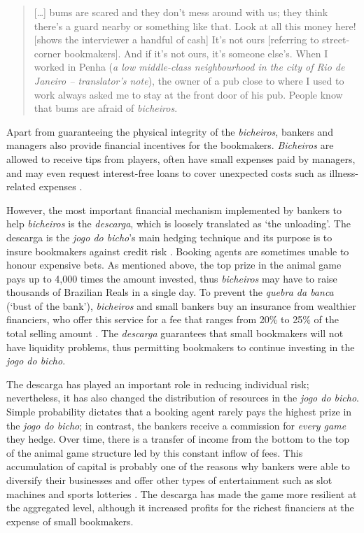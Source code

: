 \begin{quote}
	[\dots] bums are scared and they don't mess around with us; they think there's a guard nearby or something like that. Look at all this money here! [shows the interviewer a handful of cash] It's not ours [referring to street-corner bookmakers]. And if it's not ours, it's someone else's. When I worked in Penha (\emph{a low middle-class neighbourhood in the city of Rio de Janeiro -- translator's note}), the owner of a pub close to where I used to work always asked me to stay at the front door of his pub. People know that bums are afraid of \emph{bicheiros}.
\end{quote}

Apart from guaranteeing the physical integrity of the \emph{bicheiros}, bankers and managers also provide financial incentives for the bookmakers. \emph{Bicheiros} are allowed to receive tips from players, often have small expenses paid by managers, and may even request interest-free loans to cover unexpected costs such as illness-related expenses \citep{labronici2012paratodos}.

However, the most important financial mechanism implemented by bankers to help \emph{bicheiros} is the \emph{descarga}, which is loosely translated as `the unloading'. The descarga is the \emph{jogo do bicho}'s main hedging technique and its purpose is to insure bookmakers against credit risk \citetext{\citealp[59]{labronici2012paratodos}; \citealp[178]{magalhaes2005ganhou}; \citealp[16]{misse2007illegal}; \citealp[75]{soares1993jogo}}. Booking agents are sometimes unable to honour expensive bets. As mentioned above, the top prize in the animal game pays up to 4,000 times the amount invested, thus \emph{bicheiros} may have to raise thousands of Brazilian Reals in a single day. To prevent the \emph{quebra da banca} (`bust of the bank'), \emph{bicheiros} and small bankers buy an insurance from wealthier financiers, who offer this service for a fee that ranges from 20\% to 25\% of the total selling amount \citep{fsp2006descarga}. The \emph{descarga} guarantees that small bookmakers will not have liquidity problems, thus permitting bookmakers to continue investing in the \emph{jogo do bicho}.

The descarga has played an important role in reducing individual risk; nevertheless, it has also changed the distribution of resources in the \emph{jogo do bicho}. Simple probability dictates that a booking agent rarely pays the highest prize in the \emph{jogo do bicho}; in contrast, the bankers receive a commission for \emph{every game} they hedge. Over time, there is a transfer of income from the bottom to the top of the animal game structure led by this constant inflow of fees. This accumulation of capital is probably one of the reasons why bankers were able to diversify their businesses and offer other types of entertainment such as slot machines and sports lotteries \citep{estado2006cacaniquel,globo2015cacaniquel,terra2011cacaniquel}. The descarga has made the game more resilient at the aggregated level, although it increased profits for the richest financiers at the expense of small bookmakers.


